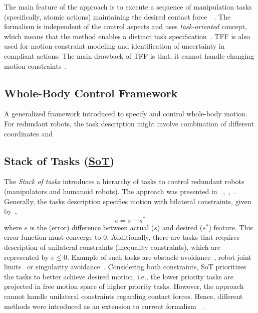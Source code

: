The main feature of the approach is to execute a sequence of manipulation tasks (specifically, atomic actions) maintaining the desired contact force~\cite{mason1981compliance}~\cite{doi:10.1177/027836498800700402}. The formalism is independent of the control aspects and uses \textit{task-oriented} concept, which means that the method enables a distinct task specification~\cite{bruyninckx1996specification}. TFF is also used for motion constraint modeling and identification of uncertainty in compliant actions. The main drawback of TFF is that, it cannot handle changing motion constraints~\cite{bruyninckx1995kinematic}. 



\subsection{Whole-Body Control Framework}
A generalized framework introduced to specify and control whole-body motion. For redundant robots, the task description might involve combination of different coordinates and 



\subsection{Stack of Tasks (\hyperref[sot]{SoT})}
The \textit{Stack of tasks} introduces a hierarchy of tasks to control redundant robots (manipulators and humanoid robots). The approach was presented in ~\cite{mansard2009versatile},~\cite{mansard2009unified},~\cite{ramos2011dynamic}. Generally, the tasks description specifies motion with bilateral constraints, given by~\cite{mansard2009unified}, 
\begin{equation}
	e = s - s^*
\end{equation}
where $e$ is the (error) difference between actual ($s$) and desired ($s^*$) feature. This error function must converge to 0. Additionally, there are tasks that requires description of unilateral constraints (inequality constraints), which are represented by $e \leq 0$. Example of such tasks are obstacle avoidance~\cite{marchand1998dynamic}, robot joint limits~\cite{chaumette2001redundancy} or singularity avoidance~\cite{padois2007kinematic}. Considering both constraints, SoT prioritizes the tasks to better achieve desired motion, i.e., the lower priority tasks are projected in free motion space of higher priority tasks. However, the approach cannot handle unilateral constraints regarding contact forces. Hence, different methods were introduced as an extension to current formalism~\cite{saab2011generic}~\cite{saab2013dynamic}. 

